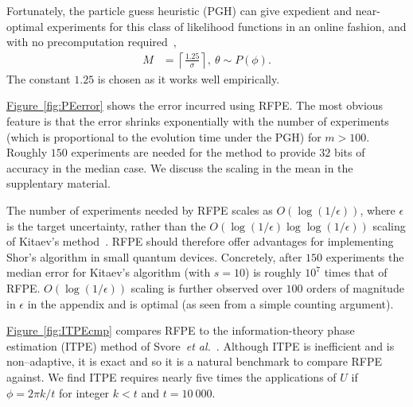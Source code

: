 \documentclass[aps,prl,amsmath,twocolumn,amssymb,superscriptaddress]{revtex4-1}
\newcommand{\app}[1]{the supplentary material}
\newcommand{\fig}[1]{\hyperref[fig:#1]{Figure~\ref*{fig:#1}}}
\newcommand{\etal}{\emph{et al.}}
\newcommand{\ee}{\mathrm{e}}
\begin{document}
Fortunately, the particle guess heuristic (PGH) can give
expedient and
near-optimal experiments for this class of likelihood
functions in an online fashion, and with no precomputation
required~\cite{wiebe_hamiltonian_2014},
\begin{align}
    M &= \left\lceil\frac{1.25}{\sigma}\right\rceil,~
    \theta \sim P(\phi).\label{eq:PGH}
\end{align}
The constant $1.25$ is chosen as it works well empirically.



\fig{PEerror} shows the error incurred using RFPE.  The most obvious feature is that the error shrinks exponentially with the number of experiments (which is proportional to the evolution time under the PGH) for $m>100$.  Roughly $150$ experiments are needed for the method to provide $32$ bits of accuracy in the median case.
We discuss the scaling in the mean in \app{var-reduction}.

The number of experiments needed by RFPE scales as $O(\log(1/\epsilon))$, where $\epsilon$ is the target uncertainty, rather than the $O(\log(1/\epsilon)\log\log(1/\epsilon))$ scaling of Kitaev's method~\cite{Kit96,kitaev2002classical}.  
 RFPE should therefore offer advantages for implementing Shor's algorithm in small quantum devices.
Concretely, after $150$ experiments the median error for Kitaev's algorithm (with $s=10$) is roughly $10^7$ times that of RFPE.  $O(\log(1/\epsilon))$ scaling  is further observed over $100$ orders of magnitude in $\epsilon$ in the appendix and is optimal (as seen from a simple counting argument).





\fig{ITPEcmp} compares RFPE to the information-theory phase estimation (ITPE) method of Svore~\etal~\cite{SHF14}.  Although ITPE is inefficient and is non--adaptive, it is exact and so it is a natural benchmark to compare RFPE against.  We find  ITPE requires nearly five times the applications of $U$ if $\phi=2\pi k/t$ for integer $k<t$ and $t=10~000$.
\end{document}
